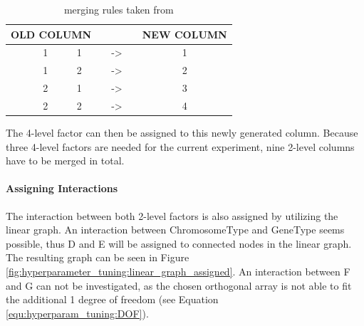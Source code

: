 \begin{table}[ht]
	\centering
	\begin{tabular}{ |ccccccc|  }
		\hline
		\multicolumn{3}{|c}{ OLD COLUMN } & & & & NEW COLUMN \\
		\hline
		& 1 & 1 & & -> & & 1\\
		& 1 & 2 & & -> & & 2\\
		& 2 & 1 & & -> & & 3\\
		& 2 & 2 & & -> & & 4\\
		\hline
	\end{tabular}
	\caption{merging rules taken from \cite{roy_primer_1990}}
	\label{tab:hyperparameter_tuning:merging_rules}
\end{table}

The 4-level factor can then be assigned to this newly generated column. Because three 4-level factors are needed for the current experiment, nine 2-level columns have to be merged in total.

\paragraph{Assigning Interactions}
The interaction between both 2-level factors is also assigned by utilizing the linear graph. An interaction between ChromosomeType and GeneType seems possible, thus D and E will be assigned to connected nodes in the linear graph. The resulting graph can be seen in Figure \ref{fig:hyperparameter_tuning:linear_graph_assigned}. An interaction between F and G can not be investigated, as the chosen orthogonal array is not able to fit the additional 1 degree of freedom (see Equation \ref{equ:hyperparam_tuning:DOF}).

